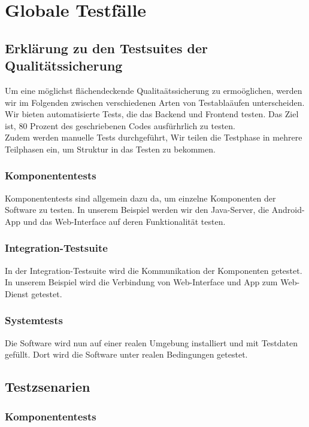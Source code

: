 \chapter{Globale Testf\"alle}
\section{Erkl\"arung zu den Testsuites der Qualit\"atssicherung}
Um eine m\"oglichst fl\"achendeckende Qualita\"atssicherung zu ermo\"oglichen, werden wir im Folgenden zwischen verschiedenen Arten von Testabla\"aufen unterscheiden. Wir bieten automatisierte Tests, die das Backend und Frontend testen. Das Ziel ist, 80 Prozent des geschriebenen Codes ausf\"urhrlich zu testen. \\
Zudem werden manuelle Tests durchgef\"uhrt, 
Wir teilen die Testphase in mehrere Teilphasen ein, um Struktur in das Testen zu bekommen.
\subsection{Komponententests}
Komponententests sind allgemein dazu da, um einzelne Komponenten der Software zu testen. In unserem Beispiel werden wir den Java-Server, die Android-App und das Web-Interface auf deren Funktionalit\"at testen. 
\subsection{Integration-Testsuite}
In der Integration-Testsuite wird die Kommunikation der Komponenten getestet. In unserem Beispiel wird die Verbindung von Web-Interface und App zum Web-Dienst getestet.
\subsection{Systemtests}
Die Software wird nun auf einer realen Umgebung installiert und mit Testdaten gef\"ullt. Dort wird die Software unter realen Bedingungen getestet.

\section{Testzsenarien}
\subsection{Komponententests}

